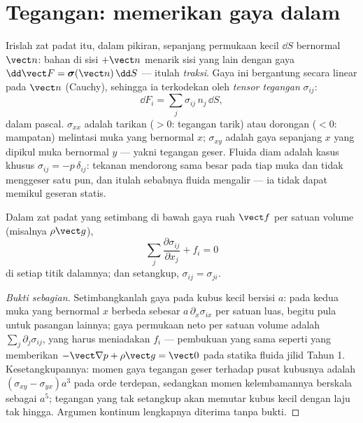 \section{Tegangan: memerikan gaya dalam}

\begin{definition}\label{def:b3:continuum-elasticity:stress}
Irislah zat padat itu, dalam pikiran, sepanjang permukaan kecil $\dd S$
bernormal $\vect n$: bahan di sisi $+\vect n$ menarik sisi yang lain
dengan gaya $\dd\vect F = \boldsymbol\sigma(\vect n)\,\dd S$ --- itulah
\emph{traksi}. Gaya ini bergantung secara linear pada $\vect n$
(Cauchy), sehingga ia terkodekan oleh \emph{tensor tegangan}
$\sigma_{ij}$:
\[
\dd F_i = \sum_j \sigma_{ij}\,n_j\,\dd S ,
\]
dalam pascal. $\sigma_{xx}$ adalah tarikan ($> 0$: tegangan tarik) atau
dorongan ($< 0$: mampatan) melintasi muka yang bernormal $x$;
$\sigma_{xy}$ adalah gaya sepanjang $x$ yang dipikul muka bernormal $y$
--- yakni tegangan geser. Fluida diam adalah kasus khusus
$\sigma_{ij} = -p\,\delta_{ij}$: tekanan mendorong sama besar pada tiap
muka dan tidak menggeser satu pun, dan itulah sebabnya fluida mengalir
--- ia tidak dapat memikul geseran statis.
\end{definition}

\begin{proposition}\label{prop:b3:continuum-elasticity:equilibrium}
Dalam zat padat yang setimbang di bawah gaya ruah $\vect f$ per satuan
volume (misalnya $\rho\vect g$),
\[
\sum_j\frac{\partial\sigma_{ij}}{\partial x_j} + f_i = 0
\]
di setiap titik dalamnya; dan  setangkup,
$\sigma_{ij} = \sigma_{ji}$.
\end{proposition}

\begin{proof}[Bukti sebagian]
Setimbangkanlah gaya pada kubus kecil bersisi $a$:  pada kedua
muka yang bernormal $x$ berbeda sebesar $a\,\partial_x\sigma_{ix}$ per
satuan luas, begitu pula untuk pasangan lainnya; gaya permukaan neto per
satuan volume adalah $\sum_j\partial_j\sigma_{ij}$, yang harus
meniadakan $f_i$ --- pembukuan yang sama seperti yang memberikan
$-\vect\nabla p + \rho\vect g = \vect 0$ pada statika fluida jilid Tahun
1. Kesetangkupannya: momen gaya tegangan geser terhadap pusat kubusnya
adalah $(\sigma_{xy} -
\sigma_{yx})a^3$ pada orde terdepan, sedangkan momen kelembamannya
berskala sebagai $a^5$; tegangan yang tak setangkup akan memutar kubus
kecil dengan laju tak hingga. Argumen kontinum lengkapnya diterima tanpa
bukti.
\end{proof}

